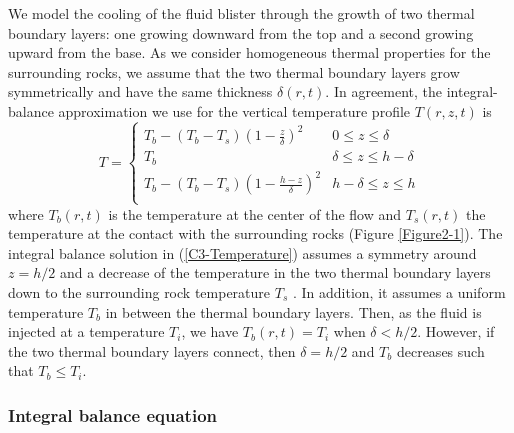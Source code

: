 We model  the cooling of the  fluid blister through the  growth of two
thermal  boundary layers:  one growing  downward  from the  top and  a
second  growing upward  from  the base.   As  we consider  homogeneous
thermal properties for  the surrounding rocks, we assume  that the two
thermal boundary layers grow symmetrically and have the same thickness
$\delta(r,t)$.   In agreement,  the integral-balance  approximation we
use for the vertical temperature profile $T(r,z,t)$ is
\begin{equation}
  T=
  \begin{cases}
    T_b - (T_b-T_s)(1-\frac{z}{\delta})^2 & 0 \le z\le \delta \\
    T_b & \delta \le z\le h-\delta \\
    T_b - (T_b-T_s)(1-\frac{h-z}{\delta})^2 & h-\delta \le z\le h\\
  \end{cases}
  \label{C3-Temperature}
\end{equation}
where $T_b(r,t)$  is the  temperature at  the center  of the  flow and
$T_s(r,t)$ the temperature  at the contact with  the surrounding rocks
(Figure   \ref{Figure2-1}).    The   integral  balance   solution   in
(\ref{C3-Temperature}) assumes  a symmetry around $z=h/2$  and a decrease
of the  temperature in  the two  thermal boundary  layers down  to the
surrounding  rock  temperature   $T_s$  \citep{BALMFORTH:2004fm}.   In
addition,  it  assumes a  uniform  temperature  $T_b$ in  between  the
thermal  boundary  layers.   Then,  as  the fluid  is  injected  at  a
temperature  $T_i$,   we  have  $T_b(r,t)  =T_i$   when  $\delta<h/2$.
However,   if  the   two   thermal  boundary   layers  connect,   then
$\delta = h/2$ and $T_b$ decreases such that $T_b\le T_i$.

\subsubsection{Integral balance equation}
\label{C3-sec:integr-balance-equat}

